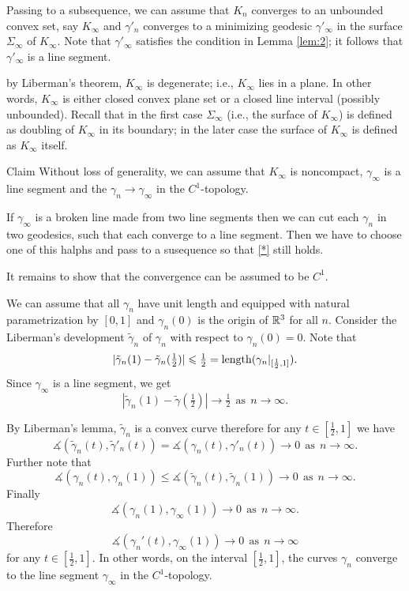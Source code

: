 \documentclass[a4paper,10pt]{amsart}
\begin{document}
Passing to a subsequence,
we can assume that $K_n$ converges to an unbounded convex set, 
say $K_\infty$ 
and $\gamma'_n$ converges to a minimizing geodesic $\gamma'_\infty$ in the surface $\Sigma_\infty$ of $K_\infty$.
Note that $\gamma'_\infty$ satisfies the condition in Lemma \ref{lem:2};
it follows that $\gamma'_\infty$ is a line segment. 

by Liberman's theorem, $K_\infty$ is degenerate;
i.e., $K_\infty$ lies in a plane.
In other words, $K_\infty$ is either closed convex plane set or a closed line interval (possibly unbounded).
Recall that in the first case $\Sigma_\infty$ (i.e., the surface of $K_\infty$)
is defined as doubling of $K_\infty$ in its boundary;
in the later case the surface of $K_\infty$ is defined as $K_\infty$ itself.



\begin{thm}{Claim}
Without loss of generality, we can assume that $K_\infty$ is noncompact, $\gamma_\infty$ is a line segment 
and the $\gamma_n\to \gamma_\infty$ in the $C^1$-topology.
\end{thm}

If $\gamma_\infty$ is a broken line made from two line segments
then we can cut each $\gamma_n$ in two geodesics, such that each converge to a line segment.
Then we have to choose one of this halphs and pass to a susequence so that \ref{*} still holds.

It remains to show that the convergence can be assumed to be $C^1$.


We can assume that all $\gamma_n$ have unit length
and equipped with natural parametrization by $[0,1]$ and $\gamma_n(0)$ is the origin of $\mathbb{R}^3$ for all $n$.
Consider the Liberman's development $\tilde\gamma_n$ of $\gamma_n$ with respect to $\gamma_n(0)=0$. 
Note that 
\[|\tilde\gamma_n(1)-\tilde\gamma_n(\tfrac12)|\leqslant \tfrac12=\mathop{\rm length}\nolimits(\gamma_n|_{[\frac12,1]}).\]
Since $\gamma_\infty$ is a line segment, we get
\[|\tilde\gamma_n(1)-\tilde\gamma(\tfrac12)|\to \tfrac12\ \ \text{as}\ \ n\to \infty.\]

By Liberman's lemma, $\tilde\gamma_n$ is a convex curve therefore for any $t\in[\tfrac12,1]$ we have
\[\measuredangle(\tilde\gamma_n(t),\tilde\gamma'_n(t))=\measuredangle(\gamma_n(t),\gamma'_n(t))\to0
\ \ \text{as}\ \ 
n\to \infty.\]
Further note that
\[
\measuredangle(\gamma_n(t),\gamma_n(1))
\le
\measuredangle(\tilde\gamma_n(t),\tilde\gamma_n(1))
\to 0 
\ \ \text{as}
\ \ 
n\to \infty.
\]
Finally
\[\measuredangle(\gamma_n(1),\gamma_\infty(1))\to 0\ \ \text{as}
\ \ 
n\to \infty.\]
Therefore 
\[\measuredangle(\gamma_n'(t),\gamma_\infty(1))\to 0\ \ \text{as}
\ \ 
n\to \infty\]
for any $t\in[\tfrac12,1]$.
In other words, on the interval $[\tfrac12,1]$, the curves $\gamma_n$ converge to the line segment $\gamma_\infty$ in the $C^1$-topology.
\end{document}
